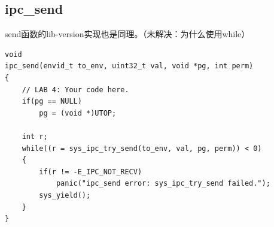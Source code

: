 \documentclass[12pt, letterpaper]{report}
\begin{document}
\newpage

\subsection{ipc\_send}
send函数的lib-version实现也是同理。（未解决：为什么使用while）
\lstset{style=CStyle}
\setmainfont{Consolas}
\begin{lstlisting}
void
ipc_send(envid_t to_env, uint32_t val, void *pg, int perm)
{
    // LAB 4: Your code here.
    if(pg == NULL)
        pg = (void *)UTOP;

    int r;
    while((r = sys_ipc_try_send(to_env, val, pg, perm)) < 0)
    {
        if(r != -E_IPC_NOT_RECV)
            panic("ipc_send error: sys_ipc_try_send failed.");
        sys_yield();
    }
}
\end{lstlisting}
\setmainfont{Times New Roman}
\end{document}
